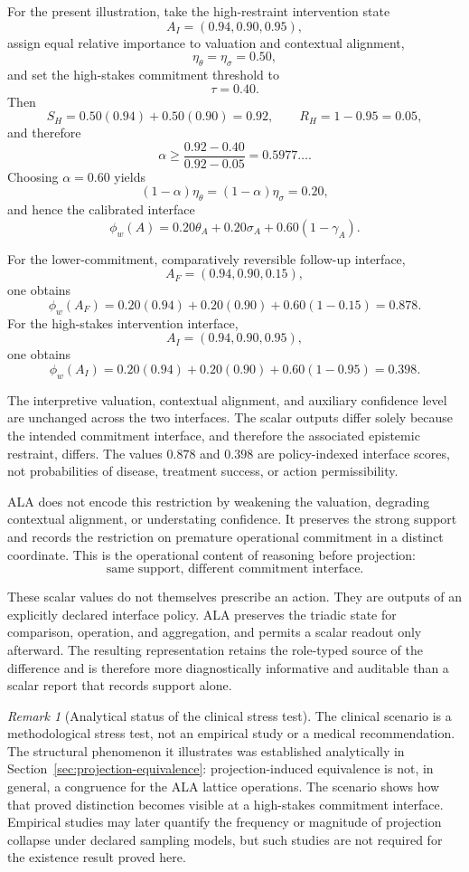 \documentclass[reqno,final]{amsart}
\theoremstyle{definition}
\theoremstyle{plain}
\theoremstyle{remark}
\newtheorem{remark}{Remark}
\begin{document}
For the present illustration, take the high-restraint intervention
state
\[
A_I=(0.94,0.90,0.95),
\]
assign equal relative importance to valuation and contextual
alignment,
\[
\eta_\theta=\eta_\sigma=0.50,
\]
and set the high-stakes commitment threshold to
\[
\tau=0.40.
\]
Then
\[
S_H
=
0.50(0.94)+0.50(0.90)
=
0.92,
\qquad
R_H
=
1-0.95
=
0.05,
\]
and therefore
\[
\alpha
\geq
\frac{0.92-0.40}{0.92-0.05}
=
0.5977\ldots.
\]
Choosing \(\alpha=0.60\) yields
\[
(1-\alpha)\eta_\theta
=
(1-\alpha)\eta_\sigma
=
0.20,
\]
and hence the calibrated interface
\[
\phi_w(A)
=
0.20\theta_A
+
0.20\sigma_A
+
0.60(1-\gamma_A).
\]

For the lower-commitment, comparatively reversible follow-up
interface,
\[
A_F=(0.94,0.90,0.15),
\]
one obtains
\[
\phi_w(A_F)
=
0.20(0.94)
+
0.20(0.90)
+
0.60(1-0.15)
=
0.878.
\]
For the high-stakes intervention interface,
\[
A_I=(0.94,0.90,0.95),
\]
one obtains
\[
\phi_w(A_I)
=
0.20(0.94)
+
0.20(0.90)
+
0.60(1-0.95)
=
0.398.
\]

The interpretive valuation, contextual alignment, and auxiliary
confidence level are unchanged across the two interfaces. The scalar
outputs differ solely because the intended commitment interface, and
therefore the associated epistemic restraint, differs. The values
\(0.878\) and \(0.398\) are policy-indexed interface scores, not
probabilities of disease, treatment success, or action permissibility.

ALA does not encode this restriction by weakening the valuation,
degrading contextual alignment, or understating confidence. It
preserves the strong support and records the restriction on premature
operational commitment in a distinct coordinate. This is the
operational content of reasoning before projection:
\[
\text{same support, different commitment interface.}
\]

These scalar values do not themselves prescribe an action. They are
outputs of an explicitly declared interface policy. ALA preserves the
triadic state for comparison, operation, and aggregation, and permits
a scalar readout only afterward. The resulting representation retains
the role-typed source of the difference and is therefore more
diagnostically informative and auditable than a scalar report that
records support alone.


\begin{remark}[Analytical status of the clinical stress test]
\label{rem:case-study-status}
The clinical scenario is a methodological stress test, not an empirical study or a medical recommendation. The structural phenomenon it illustrates was established analytically in Section~\ref{sec:projection-equivalence}: projection-induced equivalence is not, in general, a congruence for the ALA lattice operations. The scenario shows how that proved distinction becomes visible at a high-stakes commitment interface. Empirical studies may later quantify the frequency or magnitude of projection collapse under declared sampling models, but such studies are not required for the existence result proved here.
\end{remark}
\end{document}
